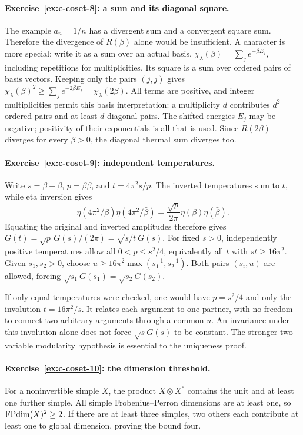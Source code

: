 \paragraph{Exercise~\ref{ex:c-coset-8}: a sum and its diagonal square.}
\label{sol:ex:c-coset-8}
The example $a_n=1/n$ has a divergent sum and a convergent square
sum. Therefore the divergence of $R(\beta)$ alone would be
insufficient. A character is more special: write it as a sum over
an actual basis,
$\chi_\lambda(\beta)=\sum_j e^{-\beta E_j}$, including repetitions
for multiplicities. Its square is a sum over ordered pairs of basis
vectors. Keeping only the pairs $(j,j)$ gives
$\chi_\lambda(\beta)^2\geq\sum_j e^{-2\beta E_j}
=\chi_\lambda(2\beta)$.
All terms are positive, and integer multiplicities permit this
basis interpretation: a multiplicity $d$ contributes $d^2$
ordered pairs and at least $d$ diagonal pairs. The shifted energies
$E_j$ may be negative; positivity of their exponentials is all
that is used. Since $R(2\beta)$ diverges for every
$\beta>0$, the diagonal thermal sum diverges too.



\paragraph{Exercise~\ref{ex:c-coset-9}: independent temperatures.}
\label{sol:ex:c-coset-9}
Write $s=\beta+\bar\beta$, $p=\beta\bar\beta$, and
$t=4\pi^2s/p$. The inverted temperatures sum to $t$, while
eta inversion gives
\[
 \eta(4\pi^2/\beta)\eta(4\pi^2/\bar\beta)
 =\frac{\sqrt p}{2\pi}\eta(\beta)\eta(\bar\beta).
\]
Equating the original and inverted amplitudes therefore gives
$G(t)=\sqrt p\,G(s)/(2\pi)=\sqrt{s/t}\,G(s)$.
For fixed $s>0$, independently positive temperatures allow
all $0<p\leq s^2/4$, equivalently all $t$ with
$st\geq16\pi^2$. Given $s_1,s_2>0$, choose
$u\geq16\pi^2\max(s_1^{-1},s_2^{-1})$. Both pairs $(s_i,u)$
are allowed, forcing $\sqrt{s_1}G(s_1)=\sqrt{s_2}G(s_2)$.

If only equal temperatures were checked, one would have
$p=s^2/4$ and only the involution $t=16\pi^2/s$.
It relates each argument to one partner, with no freedom to
connect two arbitrary arguments through a common $u$.
An invariance under this involution alone does not force
$\sqrt{s}G(s)$ to be constant. The stronger two-variable
modularity hypothesis is essential to the uniqueness proof.


\paragraph{Exercise~\ref{ex:c-coset-10}: the dimension threshold.}
\label{sol:ex:c-coset-10}
For a noninvertible simple $X$, the product $X\otimes X^*$ contains
the unit and at least one further simple. All simple
Frobenius--Perron dimensions are at least one, so
$\operatorname{FPdim}(X)^2\geq2$. If there are at least three simples, two
others each contribute at least one to global dimension, proving
the bound four.

